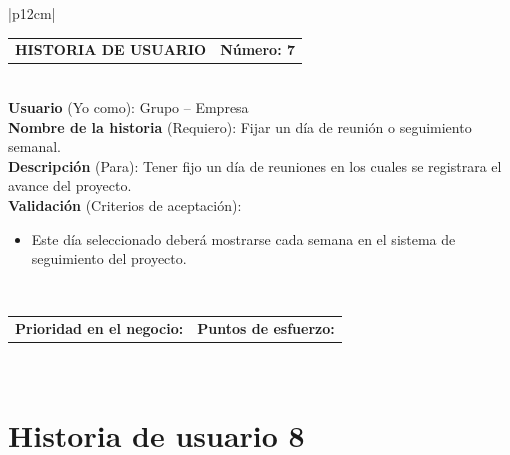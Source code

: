 \documentclass[11pt,letterpaper]{report}
\begin{document}
	\begin{center}	
		\begin{tabular}{|p{12cm}|}
			\hline
			\begin{tabular}{c|c}
				\textbf{HISTORIA DE USUARIO} & \textbf{Número: 7} \\
			\end{tabular} \\ \hline
			\textbf{Usuario} (Yo como): Grupo – Empresa \\ \hline
			\textbf{Nombre de la historia} (Requiero): Fijar un día de reunión o seguimiento semanal. \\ \hline
			\textbf{Descripción} (Para): Tener fijo un día de reuniones en los cuales se registrara el avance del proyecto. \\ \hline
			\textbf{Validación} (Criterios de aceptación): \\
			\begin{minipage}{12cm}
				\begin{itemize}
					\item Este día seleccionado deberá mostrarse cada semana en el sistema de seguimiento del proyecto.
				\end{itemize}
			\end{minipage} \\ \hline
			\begin{tabular}{c|c}
				\textbf{Prioridad en el negocio: } & \textbf{Puntos de esfuerzo: } \\
			\end{tabular} \\ \hline
		\end{tabular}
	\end{center}
	
	\section{Historia de usuario 8}
	
\end{document}
